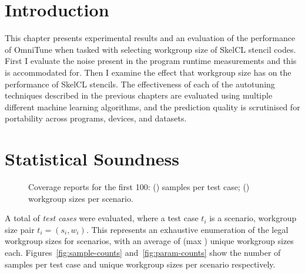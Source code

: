 \section{Introduction}

This chapter presents experimental results and an evaluation of the
performance of OmniTune when tasked with selecting workgroup size of
SkelCL stencil codes. First I evaluate the noise present in the
program runtime measurements and this is accommodated for. Then I
examine the effect that workgroup size has on the performance of
SkelCL stencils. The effectiveness of each of the autotuning
techniques described in the previous chapters are evaluated using
multiple different machine learning algorithms, and the prediction
quality is scrutinised for portability across programs, devices, and
datasets.


%


\section{Statistical Soundness}


\begin{figure}
  
  \caption{%
    Coverage reports for the first 100: ()
    samples per test case; () workgroup sizes
    per scenario.%
  }
\label{fig:num-samples}
\end{figure}


A total of  \emph{test cases} were
evaluated, where a test case $t_i$ is a scenario, workgroup size pair
$t_i = (s_i,w_i)$. This represents an exhaustive enumeration of the
legal workgroup sizes for  scenarios, with an
average of  (max )
unique workgroup sizes each. Figures~\ref{fig:sample-counts}
and~\ref{fig:param-counts} show the number of samples per test case
and unique workgroup sizes per scenario respectively.


